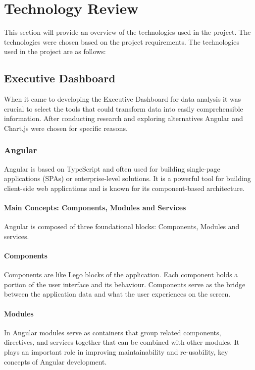\setlength{\headheight}{15pt}
\addtolength{\topmargin}{-2.5pt}

\chapter{Technology Review}

This section will provide an overview of the technologies used in the project. The technologies were chosen based on the project requirements. 
The technologies used in the project are as follows:

\section{Executive Dashboard}
When it came to developing the Executive Dashboard for data analysis it was crucial to select the tools that could transform data into easily comprehensible information. After conducting research and exploring alternatives Angular and Chart.js were chosen for specific reasons.

\subsection{Angular}
Angular is based on TypeScript and often used for building single-page applications (SPAs) or enterprise-level solutions. It is a powerful tool for building
client-side web applications and is known for its component-based architecture. 

\subsubsection{Main Concepts: Components, Modules and Services}
Angular is composed of three foundational blocks: Components, Modules and services.

\subsubsection{Components} Components are like Lego blocks of the application. Each component holds a portion of the user interface and its behaviour. Components serve as the bridge between the application data and what the user experiences on the screen.\cite{angular-components}

\subsubsection{Modules} In Angular modules serve as containers that group related components, directives, and services together that can be combined with other modules. It plays an important role in improving maintainability and re-usability, key concepts of Angular development.\cite{angular-modules}

